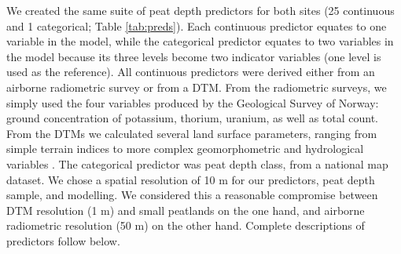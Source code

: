 \documentclass[soil, manuscript]{copernicus}
\begin{document}
We created the same suite of peat depth predictors for both sites (25 continuous and 1 categorical; Table \ref{tab:preds}).
Each continuous predictor equates to one variable in the model, while the categorical predictor equates to two variables in the model because its three levels become two indicator variables (one level is used as the reference).
All continuous predictors were derived either from an airborne radiometric survey or from a DTM.
From the radiometric surveys, we simply used the four variables produced by the Geological Survey of Norway: ground concentration of potassium, thorium, uranium, as well as total count.
From the DTMs we calculated several land surface parameters, ranging from simple terrain indices to more complex geomorphometric and hydrological variables \citep{maxwellLandsurfaceParametersSpatial2022}.
The categorical predictor was peat depth class, from a national map dataset.
We chose a spatial resolution of 10 m for our predictors, peat depth sample, and modelling.
We considered this a reasonable compromise between DTM resolution (1 m) and small peatlands on the one hand, and airborne radiometric resolution (50 m) on the other hand.
Complete descriptions of predictors follow below.
\end{document}
